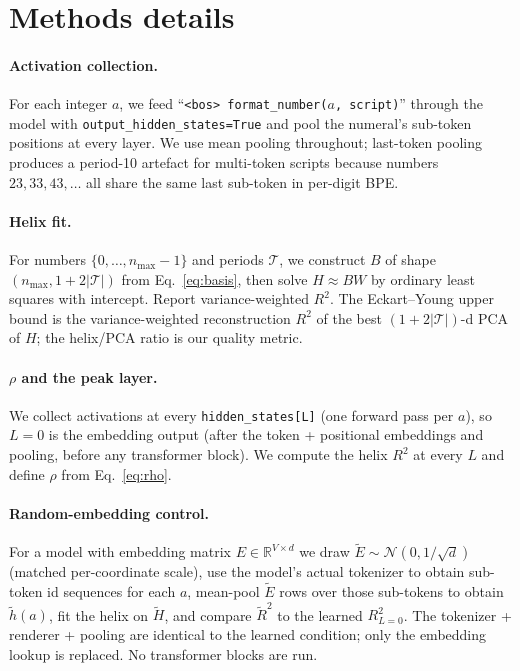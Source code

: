 \documentclass[10pt,letterpaper]{article}
\begin{document}
\appendix
\onecolumn

\section{Methods details}
\label{app:methods}

\paragraph{Activation collection.} For each integer $a$, we feed
``\texttt{<bos> {\normalfont format\_number}($a$, script)}'' through
the model with \texttt{output\_hidden\_states=True} and pool the
numeral's sub-token positions at every layer. We use mean pooling
throughout; last-token pooling produces a period-10 artefact for
multi-token scripts because numbers $23, 33, 43, \ldots$ all share
the same last sub-token in per-digit BPE.

\paragraph{Helix fit.} For numbers $\{0, \ldots, n_{\max}-1\}$ and
periods $\mathcal{T}$, we construct $B$ of shape
$(n_{\max}, 1 + 2|\mathcal{T}|)$ from Eq.~\ref{eq:basis}, then solve
$H \approx B W$ by ordinary least squares with intercept. Report
variance-weighted $R^2$. The Eckart--Young upper bound is the
variance-weighted reconstruction $R^2$ of the best $(1 + 2|\mathcal{T}|)$-d
PCA of $H$; the helix/PCA ratio is our quality metric.

\paragraph{$\rho$ and the peak layer.} We collect activations at every
\texttt{hidden\_states[L]} (one forward pass per $a$), so $L=0$ is the
embedding output (after the token + positional embeddings and pooling,
before any transformer block). We compute the helix $R^2$ at every
$L$ and define $\rho$ from Eq.~\ref{eq:rho}.

\paragraph{Random-embedding control.} For a model with embedding
matrix $E \in \mathbb{R}^{V \times d}$ we draw
$\tilde{E} \sim \mathcal{N}(0, 1/\sqrt{d})$ (matched per-coordinate
scale), use the model's actual tokenizer to obtain sub-token id
sequences for each $a$, mean-pool $\tilde{E}$ rows over those
sub-tokens to obtain $\tilde{h}(a)$, fit the helix on $\tilde{H}$, and
compare $\tilde{R}^2$ to the learned $R^2_{L=0}$. The tokenizer +
renderer + pooling are identical to the learned condition; only the
embedding lookup is replaced. No transformer blocks are run.
\end{document}
